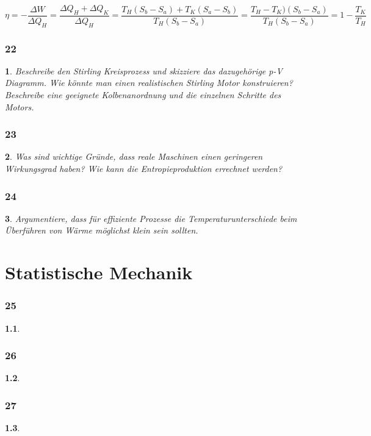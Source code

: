\documentclass[12pt,a4paper]{report}
\newtheorem{myfrag}{}%
\begin{document}
$\eta = - \dfrac{\Delta W}{ \Delta Q_H} = \dfrac{\Delta Q_H + \Delta Q_K}{\Delta Q_H}= \dfrac{T_H(S_b-S_a) + T_K(S_a -S_b)}{T_H(S_b-S_a)}=\dfrac{T_H-T_K)(S_b-S_a)}{T_H(S_b-S_a)} = 1 -\dfrac{T_K}{T_H}$


\subsection{22}
\begin{myfrag}
Beschreibe den Stirling Kreisprozess und skizziere das dazugehörige p-V
Diagramm. Wie könnte man einen realistischen Stirling Motor konstruieren?
Beschreibe eine geeignete Kolbenanordnung und die einzelnen Schritte des
Motors.
\end{myfrag}
\subsection{23}
\begin{myfrag}
Was sind wichtige Gründe, dass reale Maschinen einen geringeren Wirkungsgrad
haben? Wie kann die Entropieproduktion errechnet werden?
\end{myfrag}
\subsection{24}
\begin{myfrag}
Argumentiere, dass für effiziente Prozesse die Temperaturunterschiede beim
Überführen von Wärme möglichst klein sein sollten.
\end{myfrag}


\chapter{Statistische Mechanik}
\subsection{25}
\begin{myfrag}
\end{myfrag}
\subsection{26}
\begin{myfrag}
\end{myfrag}
\subsection{27}
\begin{myfrag}

\end{myfrag}
\end{document}
